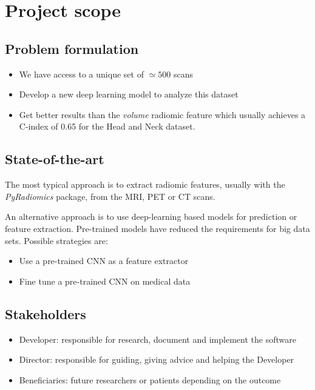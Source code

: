 
\section{Project scope}
\subsection{Problem formulation}
\begin{frame}{\insertsubsec}
  \begin{itemize}
    \item We have access to a unique set of \( \simeq 500 \) scans
    \item Develop a new deep learning model to analyze this dataset
    \item Get better results than the \emph{volume} radiomic feature which usually achieves
    a C-index of 0.65 for the Head and Neck dataset. 
  \end{itemize}
\end{frame}

\subsection{State-of-the-art}
\begin{frame}{\insertsubsec}
  The most typical approach is to extract radiomic features, usually with
  the \emph{PyRadiomics} package, from the MRI, PET or CT scans.

  \vspace{.5cm}
  An alternative approach is to use deep-learning based models for prediction or 
  feature extraction. Pre-trained models have reduced the requirements for big data sets.
  Possible strategies are:
  \begin{itemize}
    \item Use a pre-trained CNN as a feature extractor
    \item Fine tune a pre-trained CNN on medical data
  \end{itemize}
  
\end{frame}

\subsection{Stakeholders}
\begin{frame}{\insertsubsec}
  \begin{itemize}
    \item Developer: responsible for research, document and implement the software
    \item Director: responsible for guiding, giving advice and helping the Developer
    \item Beneficiaries: future researchers or patients depending on the outcome
  \end{itemize}
\end{frame}

